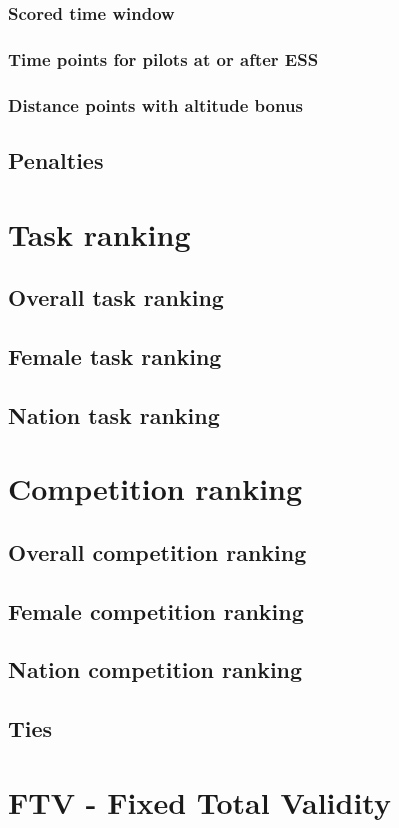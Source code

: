 \documentclass{article}
\begin{document}
\subsubsection{Scored time window}
\subsubsection{Time points for pilots at or after ESS}
\subsubsection{Distance points with altitude bonus}
\label{sec:distance-stopped-tasks}
\subsection{Penalties}

\newpage
\section{Task ranking}
\subsection{Overall task ranking}
\subsection{Female task ranking}
\subsection{Nation task ranking}

\newpage
\section{Competition ranking}
\subsection{Overall competition ranking}
\subsection{Female competition ranking}
\subsection{Nation competition ranking}
\subsection{Ties}

\newpage
\section{FTV - Fixed Total Validity}
\end{document}
